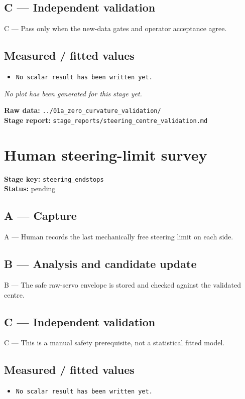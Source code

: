 \documentclass[11pt,a4paper]{article}
\begin{document}
\subsection*{C --- Independent validation}
C — Pass only when the new-data gates and operator acceptance agree.

\subsection*{Measured / fitted values}
\begin{itemize}\setlength\itemsep{0pt}
\item \texttt{No scalar result has been written yet.}
\end{itemize}

\textit{No plot has been generated for this stage yet.}

\vfill
\textbf{Raw data:} \texttt{../01a\_zero\_curvature\_validation/}\\
\textbf{Stage report:} \texttt{stage\_reports/steering\_centre\_validation.md}
\clearpage
\small
\section*{Human steering-limit survey}
\textbf{Stage key:} \texttt{steering\_endstops}\\
\textbf{Status:} pending\\

\subsection*{A --- Capture}
A — Human records the last mechanically free steering limit on each side.

\subsection*{B --- Analysis and candidate update}
B — The safe raw-servo envelope is stored and checked against the validated centre.

\subsection*{C --- Independent validation}
C — This is a manual safety prerequisite, not a statistical fitted model.

\subsection*{Measured / fitted values}
\begin{itemize}\setlength\itemsep{0pt}
\item \texttt{No scalar result has been written yet.}
\end{itemize}
\end{document}
